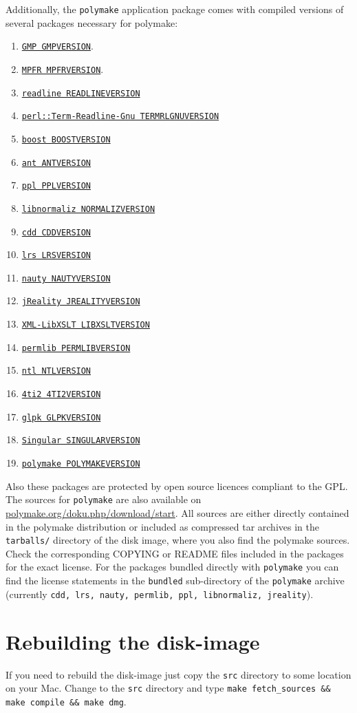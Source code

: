 \documentclass[a4paper]{amsart}
\newcommand{\polymake}{\texttt{polymake}\xspace}
\begin{document}
Additionally, the \polymake application package comes with compiled
versions of several packages necessary for polymake: 
\begin{enumerate}
\item \href{GMPHOME}{\texttt{GMP GMPVERSION}}.
\item \href{MPFRHOME}{\texttt{MPFR MPFRVERSION}}.
\item \href{READLINEHOME}{\texttt{readline READLINEVERSION}}
\item \href{TERMRLGNUHOME}{\texttt{perl::Term-Readline-Gnu TERMRLGNUVERSION}}
\item \href{BOOSTHOME}{\texttt{boost BOOSTVERSION}}
\item \href{ANTHOME}{\texttt{ant ANTVERSION}}
\item \href{PPLHOME}{\texttt{ppl PPLVERSION}}
\item \href{NORMALIZHOME}{\texttt{libnormaliz NORMALIZVERSION}}
\item \href{CDDHOME}{\texttt{cdd CDDVERSION}}
\item \href{LRSHOME}{\texttt{lrs LRSVERSION}}
\item \href{NAUTYHOME}{\texttt{nauty NAUTYVERSION}}
\item \href{JREALITYHOME}{\texttt{jReality JREALITYVERSION}}
\item \href{LIBXSLTHOME}{\texttt{XML-LibXSLT LIBXSLTVERSION}}
\item \href{PERMLIBHOME}{\texttt{permlib PERMLIBVERSION}}
\item \href{NTLHOME}{\texttt{ntl NTLVERSION}}
\item \href{4TI2HOME}{\texttt{4ti2 4TI2VERSION}}
\item \href{GLPKHOME}{\texttt{glpk GLPKVERSION}}
\item \href{SINGULARHOME}{\texttt{Singular SINGULARVERSION}}
\item \href{POLYMAKEHOME}{\texttt{polymake POLYMAKEVERSION}}
\end{enumerate}
Also these packages are protected by open source licences compliant to
the GPL. The sources for \polymake are also available on \href{http://polymake.org/doku.php/download/start}{polymake.org/doku.php/download/start}. 
All sources are either directly contained in the 
polymake distribution or included as compressed tar archives in the
\texttt{tarballs/} directory of the disk image, where you also find the polymake sources. Check the
corresponding COPYING or README files included in the packages for the
exact license.  For the packages bundled directly with \polymake you
can find the license statements in the \texttt{bundled} sub-directory
of the \polymake archive (currently \texttt{cdd, lrs, nauty, permlib, ppl, libnormaliz, jreality}).

\section*{Rebuilding the disk-image}

If you need to rebuild the disk-image just copy the \texttt{src}
directory to some location on your Mac. Change to the \texttt{src}
directory and type \texttt{make fetch\_sources \&\& make compile \&\& make dmg}.
\end{document}
